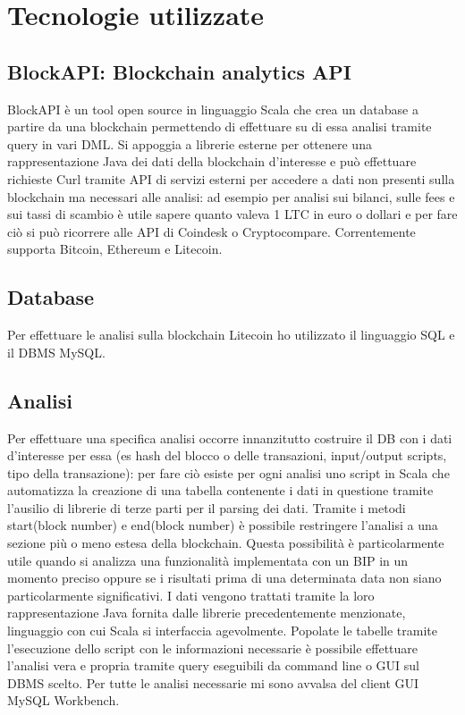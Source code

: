 \chapter{Tecnologie utilizzate}

\section{BlockAPI: Blockchain analytics API}
BlockAPI è un tool open source in linguaggio Scala che crea un database a partire da una blockchain permettendo di effettuare su di essa analisi tramite query in vari DML. Si appoggia a librerie esterne per ottenere una rappresentazione Java dei dati della blockchain d’interesse e può effettuare richieste Curl tramite API di servizi esterni per accedere a dati non presenti sulla blockchain ma necessari alle analisi: ad esempio per analisi sui bilanci, sulle fees e sui tassi di scambio è utile sapere quanto valeva 1 LTC in euro o dollari e per fare ciò si può ricorrere alle API di Coindesk o Cryptocompare. 
Correntemente supporta Bitcoin, Ethereum e Litecoin.\\
\section{Database}
Per effettuare le analisi sulla blockchain Litecoin ho utilizzato il linguaggio SQL e il DBMS MySQL.\\
\section{Analisi}
Per effettuare una specifica analisi occorre innanzitutto costruire il DB con i dati d’interesse per essa (es hash del blocco o delle transazioni, input/output scripts, tipo della transazione): per fare ciò esiste per ogni analisi uno script in Scala che automatizza la creazione di una tabella contenente i dati in questione tramite l’ausilio di librerie di terze parti per il parsing dei dati. 
Tramite i metodi start(block number) e end(block number) è possibile restringere l’analisi a una sezione più o meno estesa della blockchain. Questa possibilità è particolarmente utile quando si analizza una funzionalità implementata con un BIP in un momento preciso oppure se i risultati prima di una determinata data non siano particolarmente significativi. I dati vengono trattati tramite la loro rappresentazione Java fornita dalle librerie precedentemente menzionate, linguaggio con cui Scala si interfaccia agevolmente. Popolate le tabelle tramite l’esecuzione dello script con le informazioni necessarie è possibile effettuare l’analisi vera e propria tramite query eseguibili da command line o GUI sul DBMS scelto. Per tutte le analisi necessarie
 mi sono avvalsa del client GUI MySQL Workbench.

